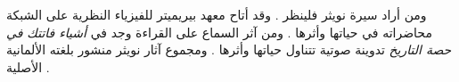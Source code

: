 \documentclass[../../../include/open-logic-section]{subfiles}
\begin{document}
\begin{reading}
ومن أراد سيرة نويثر فلينظر \citet{Dick1981}. وقد أتاح معهد بيريميتر
للفيزياء النظرية على الشبكة محاضراته في حياتها وأثرها
\citep{Perimeter2015}. ومن آثر السماع على القراءة وجد في \emph{أشياء
فاتتك في حصة التاريخ} تدوينة صوتية تتناول حياتها وأثرها
\citep{Frey2015}. ومجموع آثار نويثر منشور بلغته الألمانية الأصلية
\citep{Noether1983}.
\end{reading}
\end{document}
